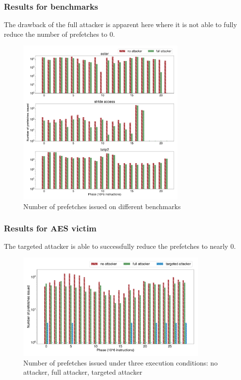 \documentclass[10pt]{beamer}
\begin{document}
\begin{frame}
\frametitle{Results for benchmarks}
The drawback of the full attacker is apparent here where it is not able to fully reduce
the number of prefetches to 0.

\begin{figure}[ht]
    \centering
    \includegraphics[width=0.75\textwidth]{hwpf_num}
    \caption{Number of prefetches issued on different benchmarks}
\end{figure}
\end{frame}

\begin{frame}
\frametitle{Results for AES victim}
The targeted attacker is able to successfully reduce the prefetches to nearly 0.
\begin{figure}[ht]
    \centering
    \includegraphics[width=0.85\textwidth]{pf_issued}
    \caption{Number of prefetches issued under three execution conditions: no attacker, full attacker, targeted attacker}
\end{figure}
\end{frame}
\end{document}
